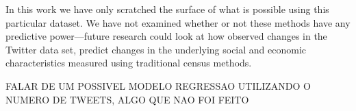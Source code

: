 \documentclass{llncs}
\begin{document}
In this work we have only scratched the surface of what is possible using this particular dataset. We have not examined whether or not these methods have any predictive power—future research could look at how observed changes in the Twitter data set, predict changes in the underlying social and economic characteristics measured using traditional census methods.

FALAR DE UM POSSIVEL MODELO REGRESSAO UTILIZANDO O NUMERO DE TWEETS, ALGO QUE NAO FOI FEITO



\end{document}
